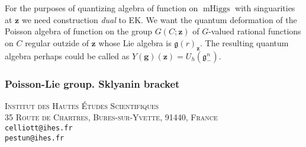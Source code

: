 \documentclass[11pt, oneside, reqno]{amsart}
\theoremstyle{definition} \newtheorem{definition}{Definition}[section]
\theoremstyle{definition} \newtheorem{remark}[definition]{Remark}
\theoremstyle{definition} \newtheorem{remarks}[definition]{Remarks}
\theoremstyle{definition} \newtheorem{question}[definition]{Question}
\theoremstyle{definition} \newtheorem*{note}{Note}
\theoremstyle{definition} \newtheorem{example}[definition]{Example}
\theoremstyle{definition} \newtheorem{examples}[definition]{Examples}
\renewcommand{\gg}{\mathfrak{g}}
\DeclareMathOperator{\mhiggs}{mHiggs}
\begin{document}
For the purposes of quantizing algebra of function on $\mhiggs$ with singuarities
at $\mathbf{z}$   we need construction \emph{dual} to EK. We want the quantum deformation
of the Poisson algebra of function on the group $G(C;\mathbf{z})$ of $G$-valued rational functions on $C$ regular outzide of $\mathbf{z}$ whose Lie algebra is $\gg(r)_{\mathbf{z}}$.
The resulting quantum algebra perhaps could be called as $Y(\mathbf{g})(\mathbf{z}) = U_{h}(\gg_{-}^{n})$.  










\subsubsection{Poisson-Lie group. Sklyanin bracket} 








\textsc{Institut des Hautes \'Etudes Scientifiques}\\
\textsc{35 Route de Chartres, Bures-sur-Yvette, 91440, France}\\
\texttt{celliott@ihes.fr}\\ 
\texttt{pestun@ihes.fr}
 
\end{document}
